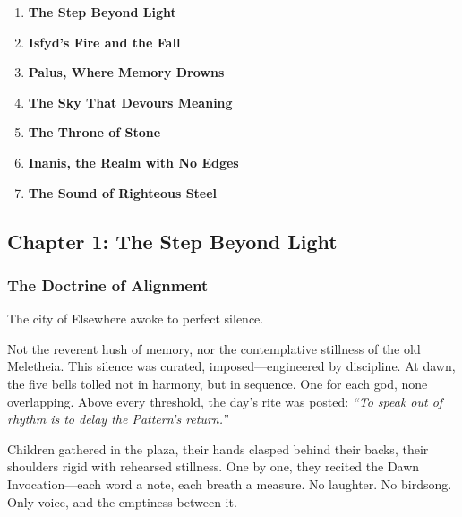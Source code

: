 \documentclass[12pt]{article}
\begin{document}
\begin{enumerate}
    \item \textbf{The Step Beyond Light} 

    \vspace{1em}
    \item \textbf{Isfyd's Fire and the Fall} 

    \vspace{1em}
    \item \textbf{Palus, Where Memory Drowns} 

    \vspace{1em}
    \item \textbf{The Sky That Devours Meaning} 

    \vspace{1em}
    \item \textbf{The Throne of Stone} 

    \vspace{1em}
    \item \textbf{Inanis, the Realm with No Edges}

    \vspace{1em}
    \item \textbf{The Sound of Righteous Steel} 

\end{enumerate}

\newpage

\subsection*{Chapter 1: The Step Beyond Light}

\vspace{.5in}

\subsubsection*{The Doctrine of Alignment}

The city of Elsewhere awoke to perfect silence.

Not the reverent hush of memory, nor the contemplative stillness of the old Meletheia. This silence was curated, imposed—engineered by discipline. At dawn, the five bells tolled not in harmony, but in sequence. One for each god, none overlapping. Above every threshold, the day's rite was posted: \textit{“To speak out of rhythm is to delay the Pattern’s return.”}

Children gathered in the plaza, their hands clasped behind their backs, their shoulders rigid with rehearsed stillness. One by one, they recited the Dawn Invocation—each word a note, each breath a measure. No laughter. No birdsong. Only voice, and the emptiness between it.
\end{document}
